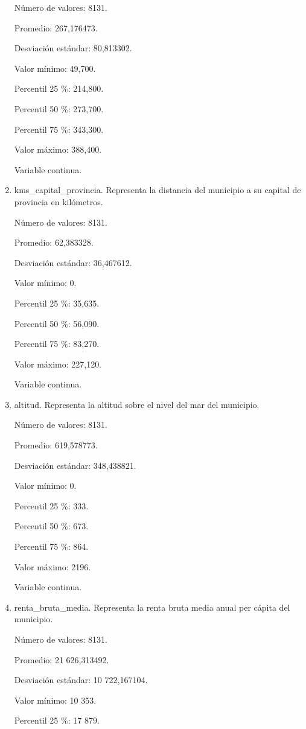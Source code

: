 \begin{enumerate}
	Número de valores: 8131.
	
	Promedio: 267,176473.
	
	Desviación estándar: 80,813302.
	
	Valor mínimo: 49,700.
	
	Percentil 25 \%: 214,800.
	
	Percentil 50 \%: 273,700.
	
	Percentil 75 \%: 343,300.
	
	Valor máximo: 388,400.
	
	Variable continua.

	\item kms\_capital\_provincia. Representa la distancia del municipio a su capital de provincia en kilómetros.
	
	Número de valores: 8131.
	
	Promedio: 62,383328.
	
	Desviación estándar: 36,467612.
	
	Valor mínimo: 0.
	
	Percentil 25 \%: 35,635.
	
	Percentil 50 \%: 56,090.
	
	Percentil 75 \%: 83,270.
	
	Valor máximo: 227,120.
	
	Variable continua.

	\item altitud. Representa la altitud sobre el nivel del mar del municipio.
	
	Número de valores: 8131.
	
	Promedio: 619,578773.
	
	Desviación estándar: 348,438821.
	
	Valor mínimo: 0.
	
	Percentil 25 \%: 333.
	
	Percentil 50 \%: 673.
	
	Percentil 75 \%: 864.
	
	Valor máximo: 2196.
	
	Variable continua.

	\item renta\_bruta\_media. Representa la renta bruta media anual per cápita del municipio.
	
	Número de valores: 8131.
	
	Promedio: 21 626,313492.
	
	Desviación estándar: 10 722,167104.
	
	Valor mínimo: 10 353.
	
	Percentil 25 \%: 17 879.
	

\end{enumerate}
